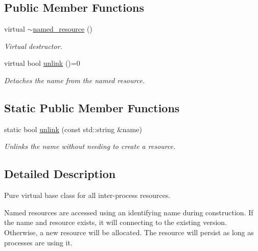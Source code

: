 \subsection*{Public Member Functions}
\begin{DoxyCompactItemize}
\item 
\mbox{\label{classcpen333_1_1process_1_1named__resource_a2bf88d9fa295c5e9ffecf2a43414e6da}} 
virtual \hyperlink{classcpen333_1_1process_1_1named__resource_a2bf88d9fa295c5e9ffecf2a43414e6da}{$\sim$named\+\_\+resource} ()
\begin{DoxyCompactList}\small\item\em Virtual destructor. \end{DoxyCompactList}\item 
virtual bool \hyperlink{classcpen333_1_1process_1_1named__resource_a5d33168fee48c9b0c58ab8fd96e230ce}{unlink} ()=0
\begin{DoxyCompactList}\small\item\em Detaches the name from the named resource. \end{DoxyCompactList}\end{DoxyCompactItemize}
\subsection*{Static Public Member Functions}
\begin{DoxyCompactItemize}
\item 
static bool \hyperlink{classcpen333_1_1process_1_1named__resource_a6cb427f033b51f08fcf2bc1e08bd6a32}{unlink} (const std\+::string \&name)
\begin{DoxyCompactList}\small\item\em Unlinks the name without needing to create a resource. \end{DoxyCompactList}\end{DoxyCompactItemize}


\subsection{Detailed Description}
Pure virtual base class for all inter-\/process resources. 

Named resources are accessed using an identifying name during construction. If the name and resource exists, it will connecting to the existing version. Otherwise, a new resource will be allocated. The resource will persist as long as processes are using it.

